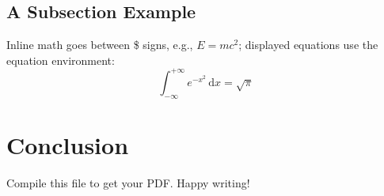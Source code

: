 \subsection{A Subsection Example}
Inline math goes between \$ signs, e.g., $E = mc^2$;
displayed equations use the equation environment:
\begin{equation}
  \int_{-\infty}^{+\infty} e^{-x^2} \,\mathrm{d}x = \sqrt{\pi}
\end{equation}

\section{Conclusion}
Compile this file to get your PDF. Happy writing!


